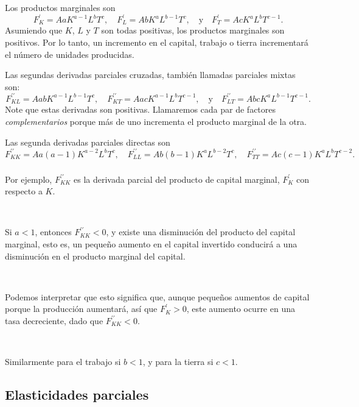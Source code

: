 \begin{frame}[t]
	\frametitle{\secname}
\begin{proofs}
Los productos marginales son \[ F^{\prime}_{K}=AaK^{a-1}L^{b}T^{c},\quad F^{\prime}_{L}=AbK^{a}L^{b-1}T^{c},\quad\text{y}\quad F^{\prime}_{T}=AcK^{a}L^{b}T^{c-1}. \] Asumiendo que $K$, $L$ y $T$ son todas positivas, los productos marginales son positivos. Por lo tanto, un incremento en el capital, trabajo o tierra incrementará el número de unidades producidas.

Las segundas derivadas parciales cruzadas, también llamadas parciales mixtas son: \[ F^{\prime\prime}_{KL}=AabK^{a-1}L^{b-1}T^{c},\quad F^{\prime\prime}_{KT}=AacK^{a-1}L^{b}T^{c-1},\quad\text{y}\quad F^{\prime\prime}_{LT}=AbcK^{a}L^{b-1}T^{c-1}. \] Note que estas derivadas son positivas. Llamaremos cada par de factores \emph{complementarios} porque más de uno incrementa el producto marginal de la otra.

Las segunda derivadas parciales directas son \[ F^{\prime\prime}_{KK}=Aa\left(a-1\right)K^{a-2}L^{b}T^{c},\quad F^{\prime\prime}_{LL}=Ab\left(b-1\right)K^{a}L^{b-2}T^{c},\quad F^{\prime\prime}_{TT}=Ac\left(c-1\right)K^{a}L^{b}T^{c-2}. \]
\end{proofs}
\end{frame}

\begin{frame}[t]
\frametitle{\secname}
\begin{proofs}
Por ejemplo, $F^{\prime\prime}_{KK}$ es la derivada parcial del producto de capital marginal, $F^{\prime}_{K}$ con respecto a $K$.

\

Si $a<1$, entonces $F^{\prime\prime}_{KK}<0$, y existe una disminución del producto del capital marginal, esto es, un pequeño aumento en el capital invertido conducirá a una disminución en el producto marginal del capital.

\

Podemos interpretar que esto significa que, aunque pequeños aumentos de capital porque la producción aumentará, así que $F^{\prime}_{K}>0$, este aumento ocurre en una tasa decreciente, dado que $F^{\prime\prime}_{KK}<0$.

\

Similarmente para el trabajo si $b<1$, y para la tierra si $c<1$.
\end{proofs}
\end{frame}

\subsection{Elasticidades parciales}

